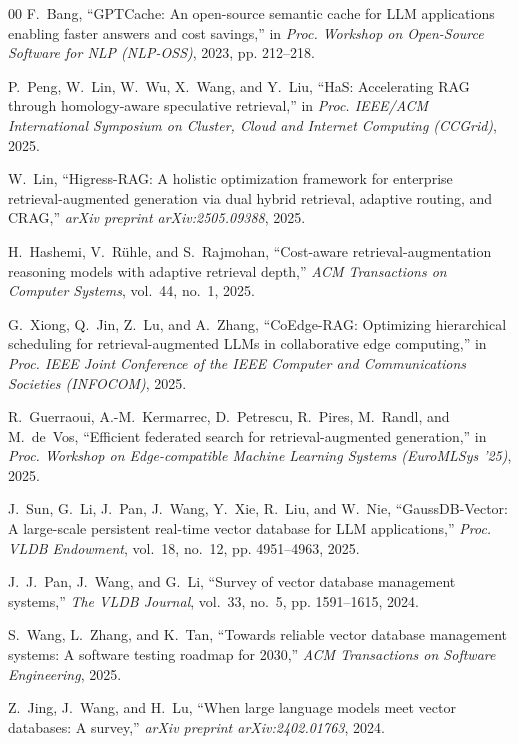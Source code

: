 \documentclass{ieeeaccess}
\begin{document}
\begin{thebibliography}{00}
F.~Bang, 
``GPTCache: An open-source semantic cache for LLM applications enabling faster answers and cost savings,'' 
in \emph{Proc. Workshop on Open-Source Software for NLP (NLP-OSS)}, 2023, pp. 212--218.

P.~Peng, W.~Lin, W.~Wu, X.~Wang, and Y.~Liu, 
``HaS: Accelerating RAG through homology-aware speculative retrieval,'' 
in \emph{Proc. IEEE/ACM International Symposium on Cluster, Cloud and Internet Computing (CCGrid)}, 2025.

W.~Lin, 
``Higress-RAG: A holistic optimization framework for enterprise retrieval-augmented generation via dual hybrid retrieval, adaptive routing, and CRAG,'' 
\emph{arXiv preprint arXiv:2505.09388}, 2025.

H.~Hashemi, V.~Rühle, and S.~Rajmohan, 
``Cost-aware retrieval-augmentation reasoning models with adaptive retrieval depth,'' 
\emph{ACM Transactions on Computer Systems}, vol.~44, no.~1, 2025.

G.~Xiong, Q.~Jin, Z.~Lu, and A.~Zhang, 
``CoEdge-RAG: Optimizing hierarchical scheduling for retrieval-augmented LLMs in collaborative edge computing,'' 
in \emph{Proc. IEEE Joint Conference of the IEEE Computer and Communications Societies (INFOCOM)}, 2025.

R.~Guerraoui, A.-M.~Kermarrec, D.~Petrescu, R.~Pires, M.~Randl, and M.~de~Vos, 
``Efficient federated search for retrieval-augmented generation,'' 
in \emph{Proc. Workshop on Edge-compatible Machine Learning Systems (EuroMLSys '25)}, 2025.

J.~Sun, G.~Li, J.~Pan, J.~Wang, Y.~Xie, R.~Liu, and W.~Nie, 
``GaussDB-Vector: A large-scale persistent real-time vector database for LLM applications,'' 
\emph{Proc. VLDB Endowment}, vol.~18, no.~12, pp. 4951--4963, 2025.

J.~J.~Pan, J.~Wang, and G.~Li, 
``Survey of vector database management systems,'' 
\emph{The VLDB Journal}, vol.~33, no.~5, pp. 1591--1615, 2024.

S.~Wang, L.~Zhang, and K.~Tan, 
``Towards reliable vector database management systems: A software testing roadmap for 2030,'' 
\emph{ACM Transactions on Software Engineering}, 2025.

Z.~Jing, J.~Wang, and H.~Lu, 
``When large language models meet vector databases: A survey,'' 
\emph{arXiv preprint arXiv:2402.01763}, 2024.


\end{thebibliography}
\end{document}
